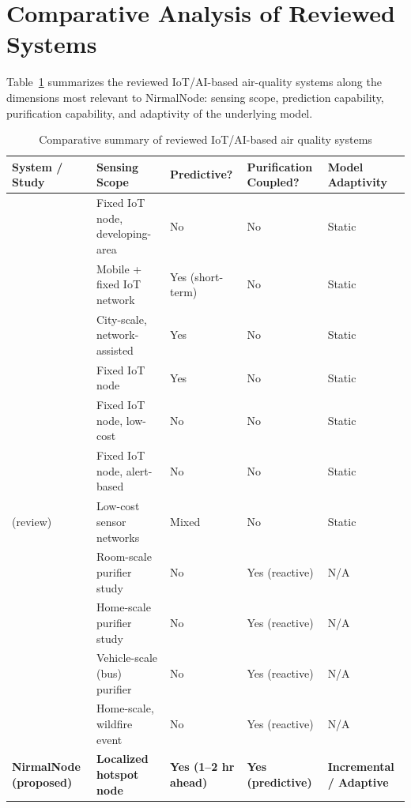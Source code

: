 \section{Comparative Analysis of Reviewed Systems}
\label{sec:lr-comparison}

Table~\ref{tab:lr-comparison} summarizes the reviewed IoT/AI-based air-quality systems along the dimensions most relevant to NirmalNode: sensing scope, prediction capability, purification capability, and adaptivity of the underlying model.

\begin{table}[htbp]
\centering
\caption{Comparative summary of reviewed IoT/AI-based air quality systems}
\label{tab:lr-comparison}
\small
\begin{tabular}{@{}p{2.6cm}p{2.6cm}p{2.1cm}p{2.6cm}p{2.6cm}@{}}
\toprule
\textbf{System / Study} & \textbf{Sensing Scope} & \textbf{Predictive?} & \textbf{Purification Coupled?} & \textbf{Model Adaptivity} \\
\midrule
\citet{alam2025iot} & Fixed IoT node, developing-area & No & No & Static \\
\citet{zhang2020realtime} & Mobile + fixed IoT network & Yes (short-term) & No & Static \\
\citet{kataria2022aiiot} & City-scale, network-assisted & Yes & No & Static \\
\citet{mani2021aipowered} & Fixed IoT node & Yes & No & Static \\
\citet{ramadhani2025iot} & Fixed IoT node, low-cost & No & No & Static \\
\citet{pavan2025realtime} & Fixed IoT node, alert-based & No & No & Static \\
\citet{shabbir2025paradigm} (review) & Low-cost sensor networks & Mixed & No & Static \\
\citet{dubey2021assessing} & Room-scale purifier study & No & Yes (reactive) & N/A \\
\citet{lu2023realworld} & Home-scale purifier study & No & Yes (reactive) & N/A \\
\citet{lee2022effect} & Vehicle-scale (bus) purifier & No & Yes (reactive) & N/A \\
\citet{chen2025fine} & Home-scale, wildfire event & No & Yes (reactive) & N/A \\
\textbf{NirmalNode (proposed)} & \textbf{Localized hotspot node} & \textbf{Yes (1--2 hr ahead)} & \textbf{Yes (predictive)} & \textbf{Incremental / Adaptive} \\
\bottomrule
\end{tabular}
\end{table}

